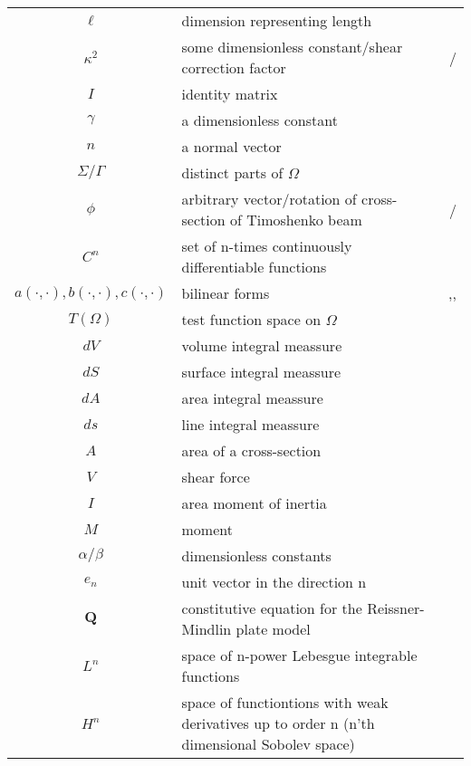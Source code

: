 \documentclass[main.tex]{subfiles}
\begin{document}
\begin{tabularx}{\textwidth}{cXr}
\( \ell \) & dimension representing length & \pageref{sym:ell} \\
\( \kappa^2 \) & some dimensionless constant/shear correction factor & \pageref{sym:kappa2}/\pageref{sym:kappa2T} \\
\( I \) & identity matrix & \pageref{sym:I} \\
\( \gamma \) & a dimensionless constant & \pageref{sym:gamma} \\
\( n \) & a normal vector & \pageref{sym:n} \\
\( \Sigma/\Gamma \) & distinct parts of $\Omega$ & \pageref{sym:SigmaGamma} \\
\( \phi \) & arbitrary vector/rotation of cross-section of Timoshenko beam & \pageref{sym:phi}/\pageref{sym:phiT} \\
\( C^n \) & set of n-times continuously differentiable functions & \pageref{sym:Cn} \\
\( a(\cdot,\cdot),b(\cdot,\cdot),c(\cdot,\cdot) \) & bilinear forms & \pageref{sym:a},\pageref{sym:b},\pageref{sym:c} \\
\( T(\Omega) \) & test function space on $\Omega$ & \pageref{sym:TOmega} \\
\( dV \) & volume integral meassure & \pageref{sym:dV} \\
\( dS \) & surface integral meassure & \pageref{sym:dS} \\
\( dA \) & area integral meassure & \pageref{sym:dA} \\
\( ds \) & line integral meassure & \pageref{sym:ds} \\
\( A \) & area of a cross-section & \pageref{sym:A} \\
\( V \) & shear force & \pageref{sym:V} \\
\( I \) & area moment of inertia & \pageref{sym:Iinertia} \\
\( M \) & moment & \pageref{sym:M} \\
\( \alpha/\beta \) & dimensionless constants & \pageref{sym:alphabeta} \\
\( e_n \) & unit vector in the direction n & \pageref{sym:en} \\
\( \mathbf{Q} \) & constitutive equation for the Reissner-Mindlin plate model & \pageref{sym:bfQ} \\
\( L^n \) & space of n-power Lebesgue integrable functions & \pageref{sym:Ln} \\
\( H^n \) & space of functiontions with weak derivatives up to order n (n'th dimensional Sobolev space) & \pageref{sym:Hn} \\

\end{tabularx}
\end{document}

